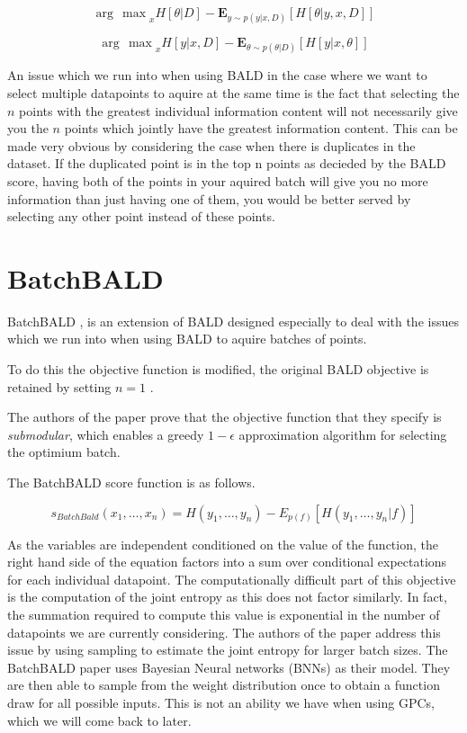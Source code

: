 \documentclass[12pt, a4paper]{report}
\theoremstyle{definition}
\begin{document}
$${\arg\,\max}_x H \left[ \theta | D \right] - \mathbf{E}_{y \sim p(y | x, D)} \left[ H\left[ \theta | y, x, D\right]\right]$$

$${\arg\,\max}_x H \left[ y | x, D \right] - \mathbf{E}_{\theta \sim p(\theta | D)} \left[ H\left[ y | x, \theta \right]\right]$$


An issue which we run into when using BALD in the case where we want to select multiple datapoints to aquire at the same time is the fact that selecting the $n$ points with the greatest individual information content will not necessarily give you the $n$ points which jointly have the greatest information content. This can be made very obvious by considering the case when there is duplicates in the dataset. If the duplicated point is in the top n points as decieded by the BALD score, having both of the points in your aquired batch will give you no more information than just having one of them, you would be better served by selecting any other point instead of these points.

\section{BatchBALD}
BatchBALD \cite{kirsch2019batchbald}, is an extension of BALD designed especially to deal with the issues which we run into when using BALD to aquire batches of points.

To do this the objective function is modified, the original BALD objective is retained by setting $n = 1$ .

The authors of the paper prove that the objective function that they specify is \textit{submodular}, which enables a greedy $1 - \epsilon$ approximation algorithm for selecting the optimium batch.

The BatchBALD score function is as follows.

$$s_{BatchBald} (x_1, \ldots, x_n) = H(y_1, \ldots, y_n) - E_{p(f)}\left[H(y_1, \ldots, y_n | f)\right]$$



As the variables are independent conditioned on the value of the function, the right hand side of the equation factors into a sum over conditional expectations for each individual datapoint. The computationally difficult part of this objective is the computation of the joint entropy as this does not factor similarly. In fact, the summation required to compute this value is exponential in the number of datapoints we are currently considering. The authors of the paper address this issue by using sampling to estimate the joint entropy for larger batch sizes. The BatchBALD paper uses Bayesian Neural networks (BNNs) as their model. They are then able to sample from the weight distribution once to obtain a function draw for all possible inputs. This is not an ability we have when using GPCs, which we will come back to later.
\end{document}
